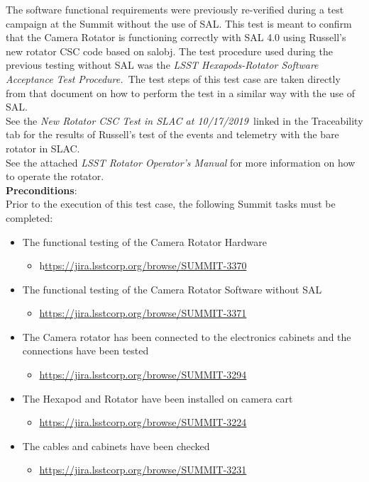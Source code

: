\documentclass[SE,lsstdraft,STR,toc]{lsstdoc}
\providecommand{\tightlist}{
  \setlength{\itemsep}{0pt}\setlength{\parskip}{0pt}}
\begin{document}
The software functional requirements were previously re-verified during
a test campaign at the Summit without the use of SAL. This test is meant
to confirm that the Camera Rotator is functioning correctly with SAL 4.0
using Russell's new rotator CSC code based on salobj. The test procedure
used during the previous testing without SAL was the \emph{LSST
Hexapods-Rotator Software Acceptance Test Procedure.~}The test steps of
this test case are taken directly from that document on how to perform
the test in a similar way with the use of SAL.\\[2\baselineskip]See the
\emph{New Rotator CSC Test in SLAC at 10/17/2019~}linked in the
Traceability tab for the results of Russell's test of the events and
telemetry with the bare rotator in SLAC.\\[2\baselineskip]See the
attached \emph{LSST Rotator Operator's Manual} for more information on
how to operate the rotator.\\[2\baselineskip]


\textbf{ Preconditions}:\\
 Prior to the execution of this test case, the following Summit tasks
must be completed:

\begin{itemize}
\tightlist
\item
  The functional testing of the Camera Rotator Hardware~

  \begin{itemize}
  \tightlist
  \item
    h\href{https://jira.lsstcorp.org/browse/SUMMIT-3370}{ttps://jira.lsstcorp.org/browse/SUMMIT-3370}
  \end{itemize}
\item
  The functional testing of the Camera Rotator Software without SAL

  \begin{itemize}
  \tightlist
  \item
    \url{https://jira.lsstcorp.org/browse/SUMMIT-3371}
  \end{itemize}
\item
  The Camera rotator has been connected to the electronics cabinets and
  the connections have been tested

  \begin{itemize}
  \tightlist
  \item
    \url{https://jira.lsstcorp.org/browse/SUMMIT-3294}
  \end{itemize}
\item
  The Hexapod and Rotator have been installed on camera cart

  \begin{itemize}
  \tightlist
  \item
    \url{https://jira.lsstcorp.org/browse/SUMMIT-3224}
  \end{itemize}
\item
  The cables and cabinets have been checked

  \begin{itemize}
  \tightlist
  \item
    \url{https://jira.lsstcorp.org/browse/SUMMIT-3231}
  \end{itemize}
\end{itemize}
\end{document}
